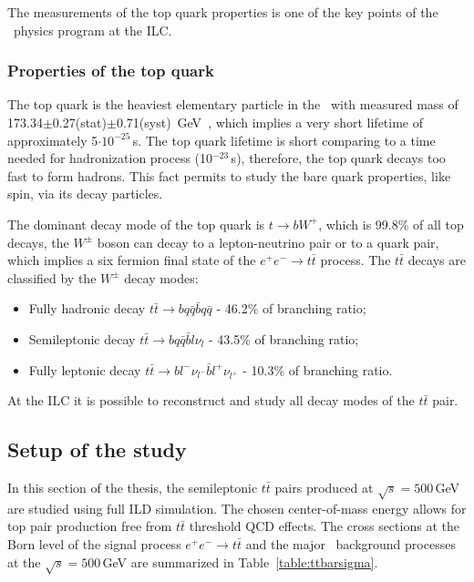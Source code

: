 The measurements of the top quark properties is one of the key points of the \sm\ physics program at the ILC.

\subsubsection{Properties of the top quark}

The top quark is the heaviest elementary particle in the \sm\ with measured mass of 173.34$\pm$0.27(stat)$\pm$0.71(syst) \,GeV~\cite{bib:TopMass}, which implies a very short lifetime of approximately 5$\cdot10^{-25}$\,s.
The top quark lifetime is short comparing to a time needed for hadronization process  (10$^{-23}$\,s), therefore, the top quark decays too fast to form hadrons. 
This fact permits to study the bare quark properties, like spin, via its decay particles. 

The dominant decay mode of the top quark is $t\to bW^+$, which is 99.8\% of all top decays, the $W^\pm$ boson can decay to a lepton-neutrino pair or to a quark pair, which implies a six fermion final state of the $e^+e^-\to t\bar{t}$ process.
The $t\bar{t}$  decays are classified by the $W^\pm$ decay modes:
\begin{itemize}
	\item Fully hadronic decay $t\bar{t} \to bq\bar{q} \bar{b} q\bar{q}$ -  46.2\% of branching ratio;
	\item Semileptonic decay $t\bar{t} \to bq\bar{q} \bar{b} l\nu_l$ - 43.5\% of branching ratio;
	\item Fully leptonic decay $t\bar{t} \to b l^- \nu_{l^-} \bar{b} l^+\nu_{l^+}$ - 10.3\% of branching ratio.	
\end{itemize}

At the ILC it is possible to reconstruct and study all decay modes of the $t\bar{t}$ pair.
\subsection{Setup of the study}
In this section of the thesis, the semileptonic $t\bar{t}$ pairs produced at $\sqrt{s}=500$\,GeV are studied using full ILD simulation.
The chosen center-of-mass energy allows for top pair production free from $t\bar{t}$ threshold QCD effects.
The cross sections at the Born level of the signal process $e^+e^- \to t\bar{t}$ and the major \small\ background processes at the $\sqrt{s} = 500$\,GeV are summarized in Table~\ref{table:ttbarsigma}.

